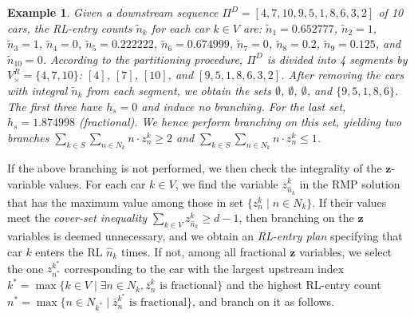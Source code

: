 \documentclass[12pt]{article}
\newtheorem{example}{Example}
\begin{document}
\begin{example}\label{ex1}
    Given a downstream sequence $\Pi^D=[4,7,10,9,5,1,8,6,3,2]$ of 10 cars, the RL-entry counts $\widetilde{n}_k$ for each car $k\in V$ are: $\widetilde{n}_1 = 0.652777$, $\widetilde{n}_2 = 1$, $\widetilde{n}_3 = 1$, $\widetilde{n}_4 = 0$, $\widetilde{n}_5 = 0.222222$, $\widetilde{n}_6 = 0.674999$, $\widetilde{n}_7 = 0$, $\widetilde{n}_8 = 0.2$, $\widetilde{n}_9 = 0.125$, and $\widetilde{n}_{10}=0$. According to the partitioning procedure, $\Pi^D$ is divided into 4 segments by $V^R_{\times}=\{4,7,10\}$: $[4]$, $[7]$, $[10]$, and $[9,5,1,8,6,3,2]$. After removing the cars with integral $\widetilde{n}_k$ from each segment, we obtain the sets $\emptyset$, $\emptyset$, $\emptyset$, and $\{9,5,1,8,6\}$. %
    The first three have $h_s = 0$ and induce no branching. For the last set, $h_s = 1.874998$ (fractional). We hence perform branching on this set, yielding two branches $\sum_{k\in S}{\sum_{n\in N_k}{n\cdot z^k_n}}\geqslant 2$ and $\sum_{k\in S}{\sum_{n\in N_k}{n\cdot z^k_n}}\leqslant 1$.
\end{example}


If the above branching is not performed, we then check the integrality of the $\boldsymbol{z}$-variable values. For each car $k\in V$, we find the variable $z^{k}_{\widehat{n}_k}$ in the RMP solution that has the maximum value among those in set $\{z^k_n \mid n\in N_k\}$. If their values meet the \textit{cover-set inequality} $\sum_{k\in V}{z^k_{\widehat{n}_k}}\geqslant d-1$, then branching on the $\boldsymbol{z}$ variables is deemed unnecessary, and we obtain an \textit{RL-entry plan} specifying that car $k$ enters the RL $\widehat{n}_k$ times. If not, among all fractional $\boldsymbol{z}$ variables, we select the one $z^{k^{*}}_{n^{*}}$ corresponding to the car with the largest upstream index $k^{*}=\max\{k\in V\mid \exists n\in N_k,
\bar{z}^k_n \text{ is fractional}\}$ and the highest RL-entry count $n^*=\max\{n\in N_{k^*}\mid \bar{z}^{k^*}_n \text{ is fractional}\}$, and branch on it as follows.
\end{document}
